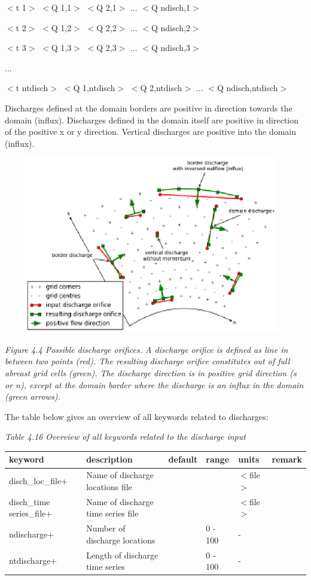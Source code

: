 \documentclass{article}
\begin{document}
\noindent $<$t 1$>$ $<$Q 1,1$>$ $<$Q 2,1$>$ ... $<$Q ndisch,1$>$

\noindent $<$t 2$>$ $<$Q 1,2$>$ $<$Q 2,2$>$ ... $<$Q ndisch,2$>$

\noindent $<$t 3$>$ $<$Q 1,3$>$ $<$Q 2,3$>$ ... $<$Q ndisch,3$>$

\noindent ...

\noindent $<$t ntdisch$>$ $<$Q 1,ntdisch$>$ $<$Q 2,ntdisch$>$ ... $<$Q ndisch,ntdisch$>$

\noindent Discharges defined at the domain borders are positive in direction towards the domain (influx). Discharges defined in the domain itself are positive in direction of the positive x or y direction. Vertical discharges are positive into the domain (influx).

\noindent \includegraphics*[width=5.09in, height=3.04in, keepaspectratio=false]{image27}

\noindent \textit{Figure 4.4 Possible discharge orifices. A discharge orifice is defined as line in between two points (red). The resulting discharge orifice constitutes out of full abreast grid cells (green). The discharge direction is in positive grid direction (s or n), except at the domain border where the discharge is an influx in the domain (green arrows).}

\noindent The table below gives an overview of all keywords related to discharges:

\noindent \textit{Table 4.16 Overview of all keywords related to the discharge input}

\begin{tabular}{|p{0.9in}|p{1.0in}|p{0.6in}|p{0.6in}|p{0.5in}|p{0.6in}|} \hline 
keyword & description & default & range & units & remark \\ \hline 
disch\_loc\_file+ & Name of discharge locations file &  &  & $<$file$>$ &  \\ \hline 
disch\_time series\_file+ & Name of discharge time series file &  &  & $<$file$>$ &  \\ \hline 
ndischarge+ & Number of discharge locations &   & 0 - 100 & - &  \\ \hline 
ntdischarge+ & Length of discharge time series &   & 0 - 100 & - &  \\ \hline 
\end{tabular}
\end{document}
